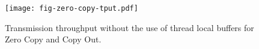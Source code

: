 \begin{figure}[t]
\texttt{[image: fig-zero-copy-tput.pdf]}
\caption{Transmission throughput without the use of thread local buffers for Zero Copy and Copy Out.}
\label{fig:zero-copy-tput}
\end{figure}
